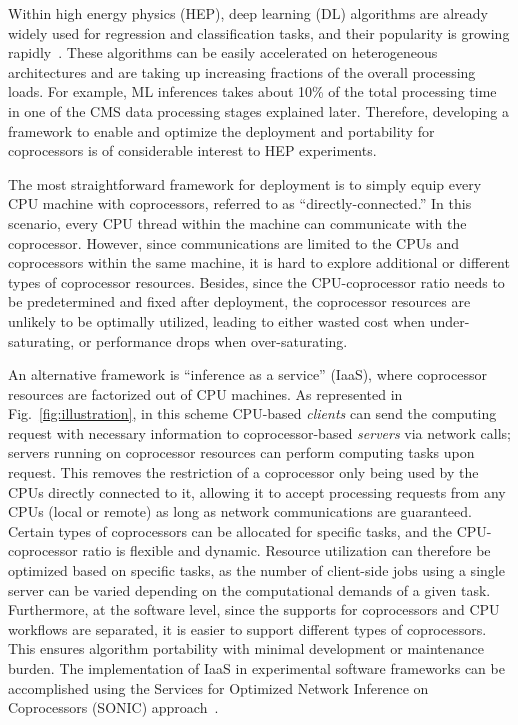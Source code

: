Within high energy physics (HEP), deep learning (DL) algorithms are already widely used for regression and classification tasks, and their popularity is growing rapidly~\cite{Guest:2018yhq, Albertsson:2018maf, Bourilkov:2019yoi, Larkoski:2017jix}. These algorithms can be easily accelerated on heterogeneous architectures and are taking up increasing fractions of the overall processing loads. For example, ML inferences takes about 10\% of the total processing time in one of the CMS data processing stages explained later. Therefore, developing a framework to enable and optimize the deployment and portability for coprocessors is of considerable interest to HEP experiments.

The most straightforward framework for deployment is to simply equip every CPU machine with coprocessors, referred to as ``directly-connected.'' In this scenario, every CPU thread within the machine can communicate with the coprocessor. However, since communications are limited to the CPUs and coprocessors within the same machine, it is hard to explore additional or different types of coprocessor resources. Besides, since the CPU-coprocessor ratio needs to be predetermined and fixed after deployment, the coprocessor resources are unlikely to be optimally utilized, leading to either wasted cost when under-saturating, or performance drops when over-saturating.

An alternative framework is ``inference as a service'' (IaaS), where coprocessor resources are factorized out of CPU machines. As represented in Fig.~\ref{fig:illustration}, in this scheme CPU-based \emph{clients} can send the computing request with necessary information to coprocessor-based \emph{servers} via network calls; servers running on coprocessor resources can perform computing tasks upon request. This removes the restriction of a coprocessor only being used by the CPUs directly connected to it, allowing it to accept processing requests from any CPUs (local or remote) as long as network communications are guaranteed. Certain types of coprocessors can be allocated for specific tasks, and the CPU-coprocessor ratio is flexible and dynamic. Resource utilization can therefore be optimized based on specific tasks, as the number of client-side jobs using a single server can be varied depending on the computational demands of a given task. Furthermore, at the software level, since the supports for coprocessors and CPU workflows are separated, it is easier to support different types of coprocessors. This ensures algorithm portability with minimal development or maintenance burden. The implementation of IaaS in experimental software frameworks can be accomplished using the Services for Optimized Network Inference on Coprocessors (SONIC) approach~\cite{Duarte:2019fta}.

